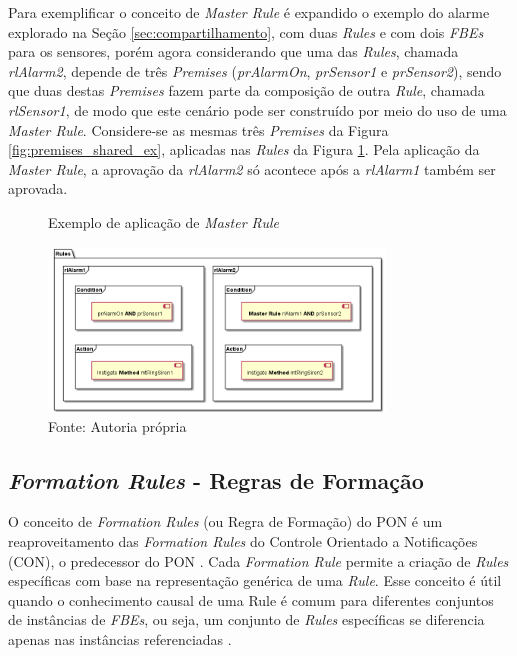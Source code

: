 Para exemplificar o conceito de \textit{Master Rule} é expandido o exemplo do
alarme explorado na Seção \ref{sec:compartilhamento}, com duas \textit{Rules} e
com dois \textit{FBEs} para os sensores, porém agora considerando que uma das
\textit{Rules}, chamada \textit{rlAlarm2}, depende de três \textit{Premises}
(\textit{prAlarmOn}, \textit{prSensor1} e \textit{prSensor2}), sendo que duas
destas \textit{Premises} fazem parte da composição de outra \textit{Rule},
chamada \textit{rlSensor1}, de modo que este cenário pode ser construído por
meio do uso de uma \textit{Master Rule}. Considere-se as mesmas três
\textit{Premises} da Figura \ref{fig:premises_shared_ex}, aplicadas nas
\textit{Rules} da Figura \ref{fig:master_rule}. Pela aplicação da \textit{Master
Rule}, a aprovação da \textit{rlAlarm2} só acontece após a \textit{rlAlarm1}
também ser aprovada.

\begin{figure}[!htb]
  \centering
  \caption{Exemplo de aplicação de \textit{Master Rule}}
  \includegraphics[width=0.8\textwidth]{../out/diagrams/master_rule/rules.png}
  \smallskip
  \caption*{Fonte: Autoria própria}
  \label{fig:master_rule}
\end{figure}

\subsection{\textit{Formation Rules} - Regras de Formação}

O conceito de \textit{Formation Rules} (ou Regra de Formação) do PON é um
reaproveitamento das \textit{Formation Rules} do Controle Orientado a
Notificações (CON), o predecessor do PON \cite{msc_simao_2001}. Cada
\textit{Formation Rule} permite a criação de \textit{Rules} específicas com base
na representação genérica de uma \textit{Rule}. Esse conceito é útil quando o
conhecimento causal de uma Rule é comum para diferentes conjuntos de instâncias
de \textit{FBEs}, ou seja, um conjunto de \textit{Rules} específicas se
diferencia apenas nas instâncias referenciadas \cite{doc_ronszcka_2019}.

